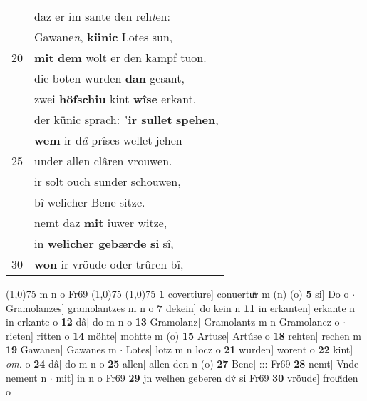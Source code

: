 \documentclass[8pt,a4paper,notitlepage]{article}
\begin{document}
\begin{table}[ht]
\begin{minipage}[t]{0.5\linewidth}
\begin{tabular}{rl}
 & daz er im sante den reh\textit{t}en:\\ 
 & Gawane\textit{n}, \textbf{künic} Lotes sun,\\ 
20 & \textbf{mit} \textbf{dem} wolt er den kampf tuon.\\ 
 & die boten wurden \textbf{dan} gesant,\\ 
 & zwei \textbf{höfschiu} kint \textbf{wîse} erkant.\\ 
 & der künic sprach: "\textbf{ir sullet} \textbf{spehen},\\ 
 & \textbf{wem} ir d\textit{â} prîses wellet jehen\\ 
25 & under allen clâren vrouwen.\\ 
 & ir solt ouch sunder schouwen,\\ 
 & bî welicher Bene sitze.\\ 
 & nemt daz \textbf{mit} iuwer witze,\\ 
 & in \textbf{welicher gebærde} \textbf{si} sî,\\ 
30 & \textbf{won} ir vröude oder trûren bî,\\ 
\end{tabular}
\scriptsize
\line(1,0){75} \newline
m n o Fr69 \newline
\line(1,0){75} \newline
\newline
\line(1,0){75} \newline
\textbf{1} covertiure] conuertuͯr m (n) (o) \textbf{5} si] Do o  $\cdot$ Gramolanzes] gramolantzes m n o \textbf{7} dekein] do kein n \textbf{11} in erkanten] erkante n in erkante o \textbf{12} dâ] do m n o \textbf{13} Gramolanz] Gramolantz m n Gramolancz o  $\cdot$ rieten] ritten o \textbf{14} möhte] mohtte m (o) \textbf{15} Artuse] Artúse o \textbf{18} rehten] rechen m \textbf{19} Gawanen] Gawanes m  $\cdot$ Lotes] lotz m n locz o \textbf{21} wurden] worent o \textbf{22} kint] \textit{om.} o \textbf{24} dâ] do m n o \textbf{25} allen] allen den n (o) \textbf{27} Bene] ::: Fr69 \textbf{28} nemt] Vnde nement n  $\cdot$ mit] in n o Fr69 \textbf{29} jn welhen geberen dv́ si Fr69 \textbf{30} vröude] frouͯiden o \newline
\end{minipage}
\end{table}
\newpage
\end{document}
